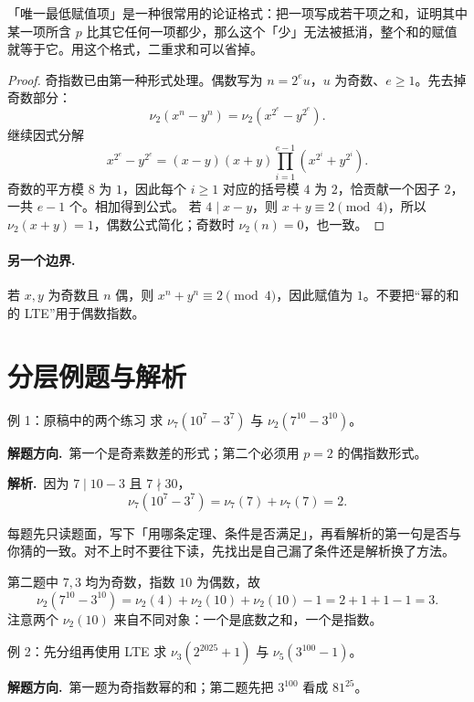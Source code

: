 \documentclass[UTF8,a4paper,11pt,twoside,openright,fontset=fandol]{ctexbook}
\theoremstyle{definition}
\newcommand{\sol}{\par\noindent\textbf{解析.}\ }
\newcommand{\hint}{\par\noindent\textbf{解题方向.}\ }
\begin{document}
\begin{tip}[方法：唯一最低赋值项]
「唯一最低赋值项」是一种很常用的论证格式：把一项写成若干项之和，证明其中某一项所含 $p$ 比其它任何一项都少，那么这个「少」无法被抵消，整个和的赋值就等于它。用这个格式，二重求和可以省掉。
\end{tip}


\begin{proof}
奇指数已由第一种形式处理。偶数写为 $n=2^e u$，$u$ 为奇数、$e\ge1$。先去掉奇数部分：
\[
\nu_2(x^n-y^n)=\nu_2(x^{2^e}-y^{2^e}).
\]
继续因式分解
\[
 x^{2^e}-y^{2^e}=(x-y)(x+y)\prod_{i=1}^{e-1}(x^{2^i}+y^{2^i}).
\]
奇数的平方模 $8$ 为 $1$，因此每个 $i\ge1$ 对应的括号模 $4$ 为 $2$，恰贡献一个因子 $2$，一共 $e-1$ 个。相加得到公式。
若 $4\mid x-y$，则 $x+y\equiv2\pmod4$，所以 $\nu_2(x+y)=1$，偶数公式简化；奇数时 $\nu_2(n)=0$，也一致。
\end{proof}
\paragraph{另一个边界.} 若 $x,y$ 为奇数且 $n$ 偶，则 $x^n+y^n\equiv2\pmod4$，因此赋值为 $1$。不要把“幂的和的 LTE”用于偶数指数。


\section{分层例题与解析}
\begin{problem}{例 1：原稿中的两个练习}
求 $\nu_7(10^7-3^7)$ 与 $\nu_2(7^{10}-3^{10})$。
\end{problem}
\hint 第一个是奇素数差的形式；第二个必须用 $p=2$ 的偶指数形式。

\sol 因为 $7\mid10-3$ 且 $7\nmid30$，
\[
 \nu_7(10^7-3^7)=\nu_7(7)+\nu_7(7)=2.
\]

\begin{tip}[怎么用一节里的例题]
每题先只读题面，写下「用哪条定理、条件是否满足」，再看解析的第一句是否与你猜的一致。对不上时不要往下读，先找出是自己漏了条件还是解析换了方法。
\end{tip}

第二题中 $7,3$ 均为奇数，指数 $10$ 为偶数，故
\[
 \nu_2(7^{10}-3^{10})=\nu_2(4)+\nu_2(10)+\nu_2(10)-1=2+1+1-1=3.
\]
注意两个 $\nu_2(10)$ 来自不同对象：一个是底数之和，一个是指数。


\begin{problem}{例 2：先分组再使用 LTE}
求 $\nu_3(2^{2025}+1)$ 与 $\nu_5(3^{100}-1)$。
\end{problem}
\hint 第一题为奇指数幂的和；第二题先把 $3^{100}$ 看成 $81^{25}$。
\end{document}
